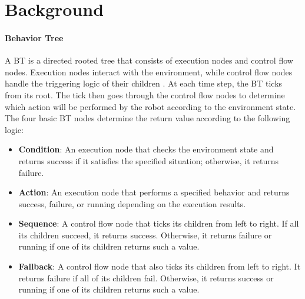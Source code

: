 \documentclass{article}
\begin{document}






\section{Background}

\paragraph{Behavior Tree}

A BT is a directed rooted tree that consists of execution nodes and control flow nodes. Execution nodes interact with the environment, while control flow nodes handle the triggering logic of their children \cite{colledanchise2018behavior}. At each time step, the BT ticks from its root. The tick then goes through the control flow nodes to determine which action will be performed by the robot according to the environment state. The four basic BT nodes determine the return value according to the following logic:
\begin{itemize}
\item \textbf{Condition}: An execution node that checks the environment state and returns {\ttfamily success} if it satisfies the specified situation; otherwise, it returns {\ttfamily failure}.
\item \textbf{Action}: An execution node that performs a specified behavior and returns {\ttfamily success}, {\ttfamily failure}, or {\ttfamily running} depending on the execution results.
\item \textbf{Sequence}: A control flow node that ticks its children from left to right. If all its children succeed, it returns {\ttfamily success}. Otherwise, it returns {\ttfamily failure} or {\ttfamily running} if one of its children returns such a value.
\item \textbf{Fallback}: A control flow node that also ticks its children from left to right. It returns {\ttfamily failure} if all of its children fail. Otherwise, it returns {\ttfamily success} or {\ttfamily running} if one of its children returns such a value.
\end{itemize}
\end{document}
